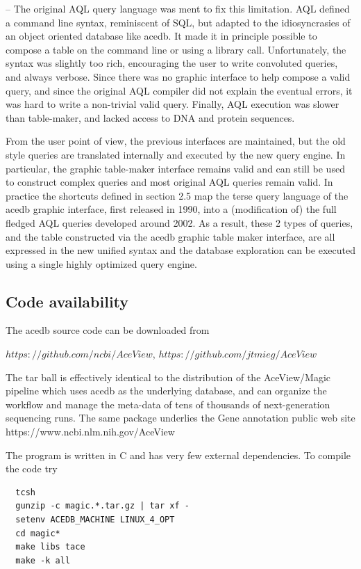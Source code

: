 \documentclass[11pt]{article}
\newcommand{\BL}{\begin{lstlisting}}
\begin{document}
-- The original AQL query language was ment to fix this limitation. AQL defined a command line syntax, reminiscent of SQL, but adapted to the idiosyncrasies of an object oriented database like acedb. It made it in principle possible to compose a table on the command line or using a library call. Unfortunately, the syntax was slightly too rich, encouraging the user to write convoluted queries, and always verbose. Since there was no graphic interface to help compose a valid query, and since the original AQL compiler did not explain the eventual errors, it was hard to write a non-trivial valid query. Finally, AQL execution was slower than table-maker, and lacked access to DNA and protein sequences. 

From the user point of view, the previous interfaces are maintained, but the old style queries are translated internally and executed by the new query engine. In particular, the graphic table-maker interface remains valid and can still be used to construct complex queries and most original AQL queries remain valid. In practice the shortcuts 
defined in section 2.5 map the terse query language of the acedb graphic interface, first released in 1990, into a (modification of) the full fledged 
AQL queries developed around 2002. As a result, these 2 types of queries, and the table constructed via the acedb graphic table 
maker interface, are all expressed in the new unified syntax and the database exploration can be executed using a single highly optimized query engine.


%%%%%%%%%%%%%%%%%%%%%%%%%%%%%%%%%%%%%%%%%%%%%%%%%%%%%%%%%%%%%%%%
% SECTION
%%%%%%%%%%%%%%%%%%%%%%%%%%%%%%%%%%%%%%%%%%%%%%%%%%%%%%%%%%%%%%%%
\subsection {Code availability}

The acedb source code can be downloaded from 
 
$https://github.com/ncbi/AceView$, $https://github.com/jtmieg/AceView$ 

The tar ball is effectively identical to the distribution of the AceView/Magic pipeline 
\cite{DJTM} which uses acedb as the underlying database, and can organize the workflow and manage the
meta-data of tens of thousands of next-generation sequencing runs. The same package
underlies the Gene annotation public web site https://www.ncbi.nlm.nih.gov/AceView \cite{cDNA}

The program is written in C and has very few external dependencies. To compile the code try
\BL
  tcsh 
  gunzip -c magic.*.tar.gz | tar xf -
  setenv ACEDB_MACHINE LINUX_4_OPT
  cd magic*
  make libs tace
  make -k all
\end{lstlisting}
 
\end{document}
